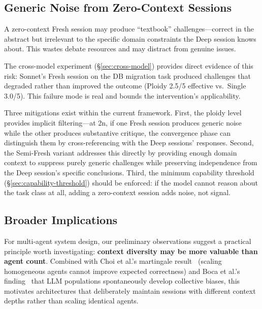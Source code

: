 \documentclass[11pt]{article}
\begin{document}
\subsection{Generic Noise from Zero-Context Sessions}
\label{sec:generic-noise}

A zero-context Fresh session may produce ``textbook'' challenges---correct in the abstract but irrelevant to the specific domain constraints the Deep session knows about. This wastes debate resources and may distract from genuine issues.

The cross-model experiment (\S\ref{sec:cross-model}) provides direct evidence of this risk: Sonnet's Fresh session on the DB migration task produced challenges that degraded rather than improved the outcome (Ploidy 2.5/5 effective vs.\ Single 3.0/5). This failure mode is real and bounds the intervention's applicability.

Three mitigations exist within the current framework. First, the ploidy level provides implicit filtering---at 2n, if one Fresh session produces generic noise while the other produces substantive critique, the convergence phase can distinguish them by cross-referencing with the Deep sessions' responses. Second, the Semi-Fresh variant addresses this directly by providing enough domain context to suppress purely generic challenges while preserving independence from the Deep session's specific conclusions. Third, the minimum capability threshold (\S\ref{sec:capability-threshold}) should be enforced: if the model cannot reason about the task class at all, adding a zero-context session adds noise, not signal.

\subsection{Broader Implications}
\label{sec:implications}

For multi-agent system design, our preliminary observations suggest a practical principle worth investigating: \textbf{context diversity may be more valuable than agent count}. Combined with Choi et al.'s martingale result~\citep{choi2025debate} (scaling homogeneous agents cannot improve expected correctness) and Boca et al.'s finding~\citep{boca2025emergent} that LLM populations spontaneously develop collective biases, this motivates architectures that deliberately maintain sessions with different context depths rather than scaling identical agents.
\end{document}
